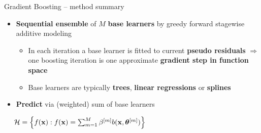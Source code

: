 \begin{frame}{Gradient Boosting -- method summary}

 

\medskip


\begin{itemize}
  \item \textbf{Sequential ensemble} of $M$ \textbf{base learners} by greedy forward stagewise additive modeling
  \begin{itemize}
      \item In each iteration a base learner is fitted to current \textbf{pseudo residuals} $\Rightarrow$ one boosting iteration is one approximate \textbf{gradient step in function space}
      \item Base learners are typically \textbf{trees}, \textbf{linear regressions} or \textbf{splines}
  \end{itemize}
  \item \textbf{Predict} via (weighted) sum of base learners
  
\end{itemize}

\medskip

 ~~
$\mathcal{H} = \left\{ f(\mathbf{x}): f(\mathbf{x}) = \sum_{m = 1}^M \beta^{[m]} b(\mathbf{x}, \bm{\theta}^{[m]}) \right\}$


\end{frame}
